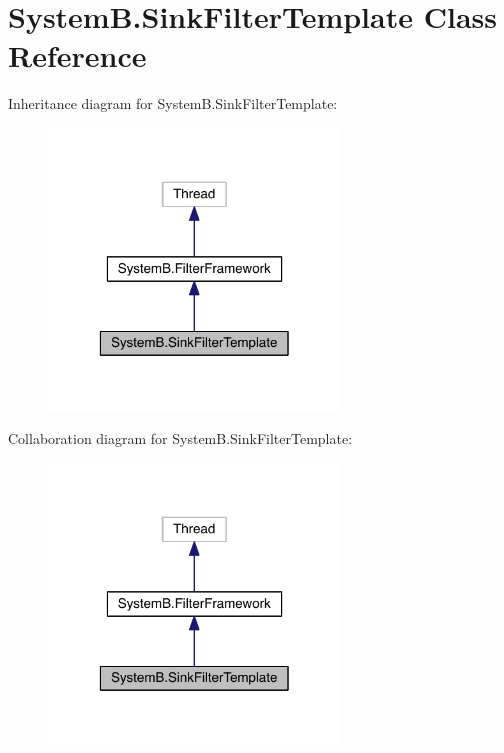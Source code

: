 \hypertarget{class_system_b_1_1_sink_filter_template}{}\section{System\+B.\+Sink\+Filter\+Template Class Reference}
\label{class_system_b_1_1_sink_filter_template}


Inheritance diagram for System\+B.\+Sink\+Filter\+Template\+:
\nopagebreak
\begin{figure}[H]
\begin{center}
\leavevmode
\includegraphics[width=220pt]{class_system_b_1_1_sink_filter_template__inherit__graph}
\end{center}
\end{figure}


Collaboration diagram for System\+B.\+Sink\+Filter\+Template\+:
\nopagebreak
\begin{figure}[H]
\begin{center}
\leavevmode
\includegraphics[width=220pt]{class_system_b_1_1_sink_filter_template__coll__graph}
\end{center}
\end{figure}
